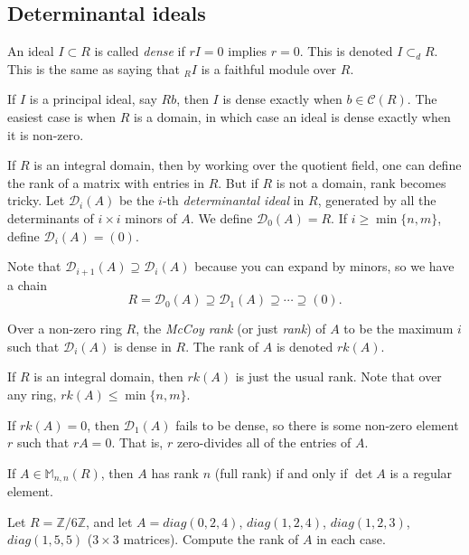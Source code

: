\subsection{Determinantal ideals}
\begin{definition}
   An ideal $I\subset R$ is called \emph{dense} if $rI=0$ implies $r=0$.
   This is denoted $I\subset_d R$. This is the same as saying that ${}_RI$ is a
   faithful module over $R$.
 \end{definition}
 If $I$ is a principal ideal, say $Rb$, then $I$ is dense exactly when $b\in \mathcal{C}(R)$. The
 easiest case is when $R$ is a domain, in which case an ideal is dense exactly when it is
 non-zero.

 If $R$ is an integral domain, then by working over the quotient field, one can define
 the rank of a matrix with entries in $R$. But if $R$ is not a domain, rank becomes
 tricky. Let $\mathcal{D}_i(A)$ be the $i$-th \emph{determinantal ideal} in $R$, generated by all
 the determinants of $i\times i$ minors of $A$. We define $\mathcal{D}_0(A)=R$. If $i\ge
 \min\{n,m\}$, define $\mathcal{D}_i(A)=(0)$.

 Note that $\mathcal{D}_{i+1}(A)\supseteq \mathcal{D}_i(A)$ because you can expand by minors, so we have a
 chain
 \[
    R=\mathcal{D}_0(A)\supseteq \mathcal{D}_1(A)\supseteq \cdots \supseteq (0).
 \]
 \begin{definition}
   Over a non-zero ring $R$, the \emph{McCoy rank} (or just \emph{rank}) of $A$ to be
   the maximum $i$ such that $\mathcal{D}_i(A)$ is dense in $R$. The rank of $A$ is denoted
   $rk(A)$.
 \end{definition}
 If $R$ is an integral domain, then $rk(A)$ is just the usual rank. Note that over any
 ring, $rk(A)\le \min\{n,m\}$.

 If $rk(A)=0$, then $\mathcal{D}_1(A)$ fails to be dense, so there is some non-zero element $r$
 such that $rA=0$. That is, $r$ zero-divides all of the entries of $A$.

 If $A\in \mathbb{M}_{n,n}(R)$, then $A$ has rank $n$ (full rank) if and only if $\det A$ is a
 regular element.

 \begin{exercise}
   Let $R=\mathbb{Z}/6\mathbb{Z} $, and let $A=diag(0,2,4)$, $diag(1,2,4)$, $diag(1,2,3)$, $diag(1,5,5)$
   ($3\times 3$ matrices). Compute the rank of $A$ in each case.
 \end{exercise}
 \begin{solution}
 \end{solution}
